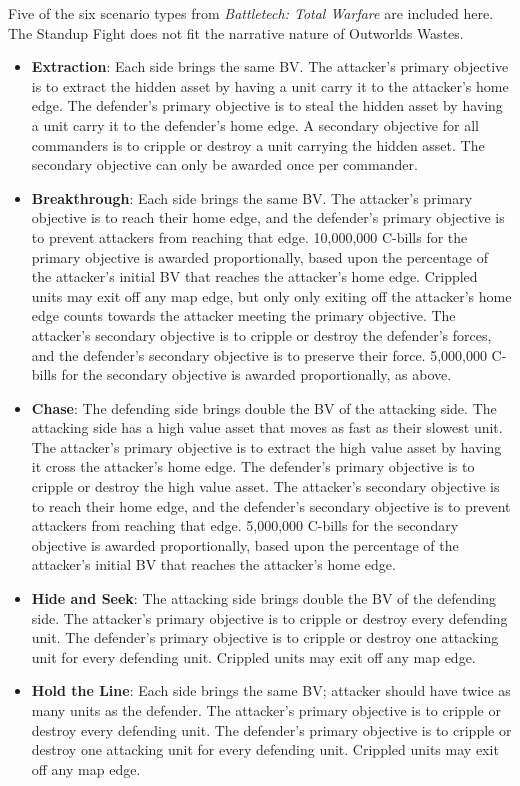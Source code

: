 \documentclass[UTF8]{article}
\begin{document}
Five of the six scenario types from \emph{Battletech: Total Warfare} are included here.
The Standup Fight does not fit the narrative nature of Outworlds Wastes.\\

\begin{itemize}

\item {\bf Extraction}: Each side brings the same BV.
The attacker's primary objective is to extract the hidden asset by having a unit carry it to the attacker's home edge.
The defender's primary objective is to steal the hidden asset by having a unit carry it to the defender's home edge.
A secondary objective for all commanders is to cripple or destroy a unit carrying the hidden asset.
The secondary objective can only be awarded once per commander.

\item {\bf Breakthrough}: Each side brings the same BV.
The attacker's primary objective is to reach their home edge, and the defender's primary objective is to prevent attackers from reaching that edge.
10,000,000 C-bills for the primary objective is awarded proportionally, based upon the percentage of the attacker's initial BV that reaches the attacker's home edge.
Crippled units may exit off any map edge, but only only exiting off the attacker's home edge counts towards the attacker meeting the primary objective.
The attacker's secondary objective is to cripple or destroy the defender's forces, and the defender's secondary objective is to preserve their force.
5,000,000 C-bills for the secondary objective is awarded proportionally, as above. 

\item {\bf Chase}: The defending side brings double the BV of the attacking side.
The attacking side has a high value asset that moves as fast as their slowest unit.
The attacker's primary objective is to extract the high value asset by having it cross the attacker's home edge.
The defender's primary objective is to cripple or destroy the high value asset.
The attacker's secondary objective is to reach their home edge, and the defender's secondary objective is to prevent attackers from reaching that edge.
5,000,000 C-bills for the secondary objective is awarded proportionally, based upon the percentage of the attacker's initial BV that reaches the attacker's home edge.

\item {\bf Hide and Seek}: The attacking side brings double the BV of the defending side.
The attacker's primary objective is to cripple or destroy every defending unit.
The defender's primary objective is to cripple or destroy one attacking unit for every defending unit.
Crippled units may exit off any map edge.

\item {\bf Hold the Line}: Each side brings the same BV; attacker should have twice as many units as the defender.
The attacker's primary objective is to cripple or destroy every defending unit.
The defender's primary objective is to cripple or destroy one attacking unit for every defending unit.
Crippled units may exit off any map edge.

\end{itemize}
\end{document}
